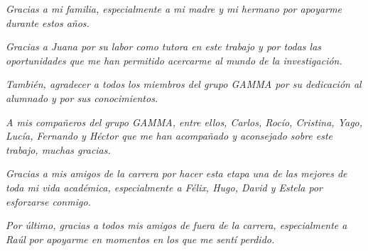 \thispagestyle{abstract}
\begin{flushright}
    \vspace*{5cm}
    \medskip
    \textit{Gracias a mi familia, especialmente a mi madre y mi hermano por apoyarme durante estos años.}

    \vspace{1\baselineskip}

    \textit{Gracias a Juana por su labor como tutora en este trabajo y por todas las oportunidades que me han permitido acercarme al mundo de la investigación.}

    \vspace{1\baselineskip}

    \textit{También, agradecer a todos los miembros del grupo GAMMA por su dedicación al alumnado y por sus conocimientos.}

    \vspace{1\baselineskip}

    \textit{A mis compañeros del grupo GAMMA, entre ellos, Carlos, Rocío, Cristina, Yago, Lucía, Fernando y Héctor que me han acompañado y aconsejado sobre este trabajo, muchas gracias.}

    \vspace{1\baselineskip}

    \textit{Gracias a mis amigos de la carrera por hacer esta etapa una de las mejores de toda mi vida académica, especialmente a Félix, Hugo, David y Estela por esforzarse conmigo.}

    \vspace{1\baselineskip}

    \textit{Por último, gracias a todos mis amigos de fuera de la carrera, especialmente a Raúl por apoyarme en momentos en los que me sentí perdido.}

\end{flushright}


